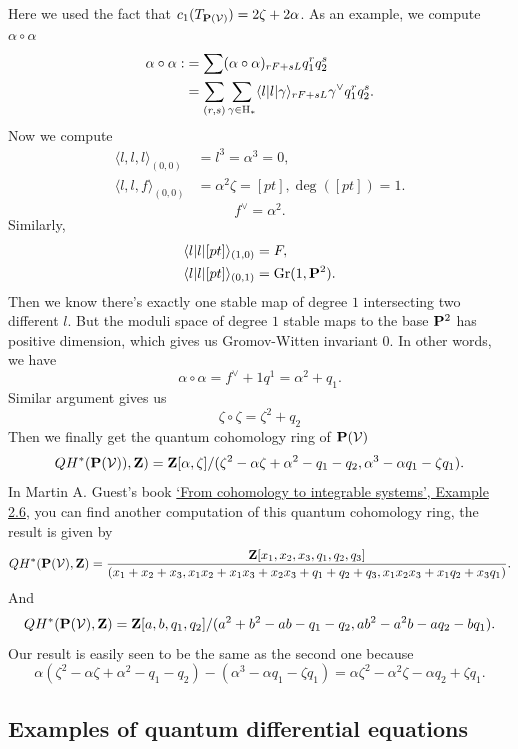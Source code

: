 \documentclass[../main.tex]{subfiles}
\begin{document}
Here we used the fact that $c_{1}(T_{\P(\mathcal{V})})=2\zeta+2\alpha$.
As an example, we compute $\alpha\circ \alpha$
\begin{align*}
\alpha\circ \alpha :&=\sum (\alpha\circ \alpha)_{rF+sL}q_{1}^{r}q_{2}^{s} \\
&=\sum_{(r,s)}\sum_{\gamma\in \H_{*}}\langle l|l|\gamma\rangle_{rF+sL}\gamma^{\vee}q_{1}^{r}q_{2}^{s}.
\end{align*}
Now we compute
\begin{align*}
\langle l,l,l\rangle_{(0,0)} &= l^{3}=\alpha^{3}=0, \\
\langle l,l,f\rangle_{(0,0)} &= \alpha^{2}\zeta=[pt], \deg([pt])=1.
\end{align*}
$$f^{\vee}=\alpha^{2}.$$
Similarly,
\begin{align*}
\langle l|l|[pt]\rangle_{(1,0)} &= F, \\
\langle l|l|[pt]\rangle_{(0,1)} &= \Gr(1, \P^{2}).
\end{align*}
Then we know there's exactly one stable map of degree $1$ intersecting two different $l$. But the moduli space of degree $1$ stable maps to the base $\P^{2}$  has positive dimension, which gives us Gromov-Witten invariant $0$. In other words, we have 
$$\alpha\circ \alpha =f^{\vee}+1q^{1}=\alpha^{2}+q_{1}.$$
Similar argument gives us
$$\zeta\circ \zeta=\zeta^{2}+q_{2}$$
Then we finally get the quantum cohomology ring of $\P(\mathcal{V})$
$$QH^{*}(\P(\mathcal{V})), \Z)=\Z[\alpha, \zeta]/(\zeta^{2}-\alpha\zeta+\alpha^{2}-q_{1}-q_{2}, \alpha^{3}-\alpha q_{1}-\zeta q_{1}).$$
In Martin A. Guest's book \href{http://www.f.waseda.jp/martin/preprints/qcis-preprint.pdf}{`From cohomology to integrable systems', Example 2.6}, you can find another computation of this quantum cohomology ring, the result is given by
$$QH^{*}(\P(\mathcal{V}), \Z)=\frac{\Z[x_{1}, x_{2}, x_{3}, q_{1}, q_{2}, q_{3}]}{(x_{1}+x_{2}+x_{3}, x_{1}x_{2}+x_{1}x_{3}+x_{2}x_{3}+q_{1}+q_{2}+q_{3}, x_{1}x_{2}x_{3}+x_{1}q_{2}+x_{3}q_{1})}.$$
And
$$QH^{*}(\P(\mathcal{V}), \Z)=\Z[a,b, q_{1}, q_{2}]/(a^{2}+b^{2}-ab-q_{1}-q_{2}, ab^{2}-a^{2}b-aq_{2}-bq_{1}).$$
Our result is easily seen to be the same as the second one because 
$$\alpha(\zeta^{2}-\alpha\zeta+\alpha^{2}-q_{1}-q_{2})-(\alpha^{3}-\alpha q_{1}-\zeta q_{1})=\alpha\zeta^{2}-\alpha^{2}\zeta-\alpha q_{2}+\zeta q_{1}.$$
\subsection{Examples of quantum differential equations}
\end{document}
